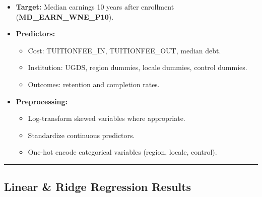 \documentclass[
  letterpaper,
  DIV=11,
  numbers=noendperiod]{scrartcl}
\providecommand{\tightlist}{%
  \setlength{\itemsep}{0pt}\setlength{\parskip}{0pt}}
\begin{document}
\begin{itemize}
\tightlist
\item
  \textbf{Target:} Median earnings 10 years after enrollment
  (\textbf{MD\_EARN\_WNE\_P10}).
\item
  \textbf{Predictors:}

  \begin{itemize}
  \tightlist
  \item
    Cost: TUITIONFEE\_IN, TUITIONFEE\_OUT, median debt.
  \item
    Institution: UGDS, region dummies, locale dummies, control dummies.
  \item
    Outcomes: retention and completion rates.
  \end{itemize}
\item
  \textbf{Preprocessing:}

  \begin{itemize}
  \tightlist
  \item
    Log-transform skewed variables where appropriate.
  \item
    Standardize continuous predictors.
  \item
    One-hot encode categorical variables (region, locale, control).
  \end{itemize}
\end{itemize}

\begin{center}\rule{0.5\linewidth}{0.5pt}\end{center}

\subsection{Linear \& Ridge Regression
Results}\label{linear-ridge-regression-results}
\end{document}
